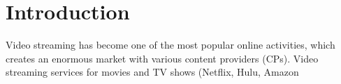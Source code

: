 


\section{Introduction} \label{sec:introduction}
Video streaming has become one of the most popular online activities,
which creates an enormous market with various content providers (CPs). 
Video streaming services for movies and TV shows (Netflix, Hulu, Amazon




